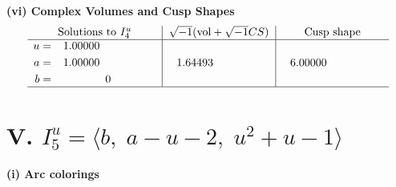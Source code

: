 \documentclass[1p]{elsarticle_modified}
\theoremstyle{definition}
\newcommand{\I}{\sqrt{-1}}
\begin{document}
\newpage\flushleft \textbf{(vi) Complex Volumes and Cusp Shapes}
$$\begin{array}{c|c|c}  
\text{Solutions to }I^u_{4}& \I (\text{vol} + \sqrt{-1}CS) & \text{Cusp shape}\\
 \hline 
\begin{aligned}
u &= \phantom{-}1.00000\phantom{ +0.000000I} \\
a &= \phantom{-}1.00000\phantom{ +0.000000I} \\
b &= \phantom{-0.000000 } 0\end{aligned}
 & \phantom{-}1.64493\phantom{ +0.000000I} & \phantom{-}6.00000\phantom{ +0.000000I}\\
 \hline 
 \end{array}$$\newpage\newpage\renewcommand{\arraystretch}{1}
\centering \section*{V. $I^u_{5}= \langle b,\;a- u-2,\;u^2+u-1 \rangle$}
\flushleft \textbf{(i) Arc colorings}\\
\end{document}
